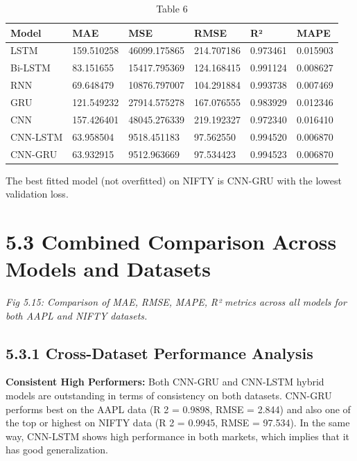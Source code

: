 \documentclass[12pt,a4paper]{report}
\begin{document}
\begin{table}[htbp]
\centering
\begin{tabular}{|l|l|l|l|l|l|}
\hline
\textbf{Model} & \textbf{MAE} & \textbf{MSE} & \textbf{RMSE} & \textbf{R²} & \textbf{MAPE} \\
\hline
LSTM & 159.510258 & 46099.175865 & 214.707186 & 0.973461 & 0.015903 \\
\hline
Bi-LSTM & 83.151655 & 15417.795369 & 124.168415 & 0.991124 & 0.008627 \\
\hline
RNN & 69.648479 & 10876.797007 & 104.291884 & 0.993738 & 0.007469 \\
\hline
GRU & 121.549232 & 27914.575278 & 167.076555 & 0.983929 & 0.012346 \\
\hline
CNN & 157.426401 & 48045.276339 & 219.192327 & 0.972340 & 0.016410 \\
\hline
CNN-LSTM & 63.958504 & 9518.451183 & 97.562550 & 0.994520 & 0.006870 \\
\hline
CNN-GRU & 63.932915 & 9512.963669 & 97.534423 & 0.994523 & 0.006870 \\
\hline
\end{tabular}
\caption{Table 6}
\label{tab:table6}
\end{table}

The best fitted model (not overfitted) on NIFTY is CNN-GRU with the lowest validation loss.

\section{5.3 Combined Comparison Across Models and Datasets}
\begin{center}
\textit{Fig 5.15: Compari}\textit{son of}\textit{ }\textit{MAE, }\textit{RMSE, }\textit{MAPE, }\textit{R²}\textit{ }\textit{metrics across all models for both AAPL and NIFTY datasets.}
\end{center}
\subsection{5.3.1 Cross-Dataset Performance Analysis}
\textbf{Consistent High Performers:}\textbf{ }Both CNN-GRU and CNN-LSTM hybrid models are outstanding in terms of consistency on both datasets. CNN-GRU performs best on the AAPL data (R 2 = 0.9898, RMSE = 2.844) and also one of the top or highest on NIFTY data (R 2 = 0.9945, RMSE = 97.534). In the same way, CNN-LSTM shows high performance in both markets, which implies that it has good generalization.
\end{document}
